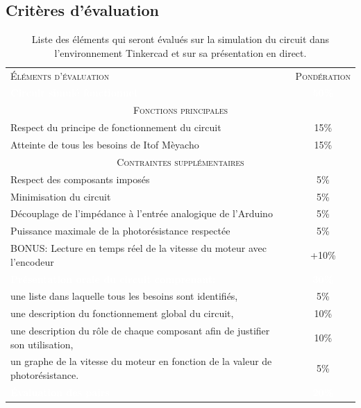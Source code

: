 \documentclass[english,french,12pt]{article}
\begin{document}
\subsection*{Critères d'évaluation}
\renewcommand{\arraystretch}{1.5}
\begin{table}[h]
\centering
    \begin{tabular}{l c}
    \hline
     \textsc{Éléments d'évaluation} & \textsc{Pondération}\\
     \rowcolor{black} \textcolor{white}{\textbf{Circuit simulé fonctionnel}} & \textcolor{white}{\textbf{50\%}}\\
     \multicolumn{2}{c}{\textsc{Fonctions principales}}\\
     \hline
     Respect du principe de fonctionnement du circuit & 15\%\\
     Atteinte de tous les besoins de Itof Mèyacho & 15\%\\
     \hline
     \multicolumn{2}{c}{\textsc{Contraintes supplémentaires}}\\
     \hline
     Respect des composants imposés & 5\%\\
     Minimisation du circuit & 5\%\\
     Découplage de l'impédance à l'entrée analogique de l'Arduino  & 5\%\\
     Puissance maximale de la photorésistance respectée & 5\%\\
     BONUS: Lecture en temps réel de la vitesse du moteur avec l'encodeur & +10\%\\
     \rowcolor{black} \textcolor{white}{\textbf{Présentation orale du circuit comprenant:}} & \textcolor{white}{\textbf{30\%}}\\
     une liste dans laquelle tous les besoins sont identifiés, & 5\%\\
     une description du fonctionnement global du circuit, & 10\%\\
     une description du rôle de chaque composant afin de justifier son utilisation, & 10\%\\
     un graphe de la vitesse du moteur en fonction de la valeur de photorésistance. & 5\%\\
     \rowcolor{black} \textcolor{white}{\textbf{Évaluation des pairs}} & \textcolor{white}{\textbf{20\%}}\\
    \end{tabular}
\caption{Liste des éléments qui seront évalués sur la simulation du circuit dans l'environnement Tinkercad et sur sa présentation en direct.}
\label{tab:1}
\end{table}
\end{document}
